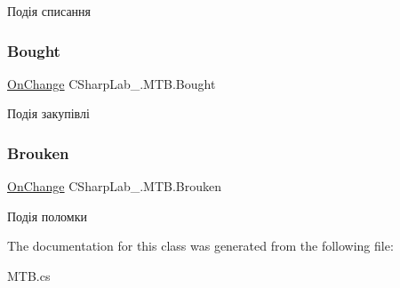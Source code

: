 Подія списання 

\hypertarget{class_c_sharp_lab__1_1_1_m_t_b_ae07bfca3c3f690f17960215d7570d247}{}\label{class_c_sharp_lab__1_1_1_m_t_b_ae07bfca3c3f690f17960215d7570d247} 
\subsubsection{\texorpdfstring{Bought}{Bought}}
{\footnotesize\ttfamily \hyperlink{class_c_sharp_lab__1_1_1_m_t_b_af571bf7359805b314bd1535dede971e2}{On\+Change} C\+Sharp\+Lab\+\_.\+M\+T\+B.\+Bought}



Подія закупівлі 

\hypertarget{class_c_sharp_lab__1_1_1_m_t_b_a98818a5eca5d6356b98673aa004532d9}{}\label{class_c_sharp_lab__1_1_1_m_t_b_a98818a5eca5d6356b98673aa004532d9} 
\subsubsection{\texorpdfstring{Brouken}{Brouken}}
{\footnotesize\ttfamily \hyperlink{class_c_sharp_lab__1_1_1_m_t_b_af571bf7359805b314bd1535dede971e2}{On\+Change} C\+Sharp\+Lab\+\_.\+M\+T\+B.\+Brouken}



Подія поломки 



The documentation for this class was generated from the following file\+:\begin{DoxyCompactItemize}
\item 
M\+T\+B.\+cs\end{DoxyCompactItemize}
